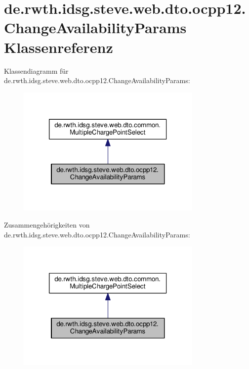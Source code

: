 \hypertarget{classde_1_1rwth_1_1idsg_1_1steve_1_1web_1_1dto_1_1ocpp12_1_1_change_availability_params}{\section{de.\-rwth.\-idsg.\-steve.\-web.\-dto.\-ocpp12.\-Change\-Availability\-Params Klassenreferenz}
\label{classde_1_1rwth_1_1idsg_1_1steve_1_1web_1_1dto_1_1ocpp12_1_1_change_availability_params}
}


Klassendiagramm für de.\-rwth.\-idsg.\-steve.\-web.\-dto.\-ocpp12.\-Change\-Availability\-Params\-:
\nopagebreak
\begin{figure}[H]
\begin{center}
\leavevmode
\includegraphics[width=256pt]{classde_1_1rwth_1_1idsg_1_1steve_1_1web_1_1dto_1_1ocpp12_1_1_change_availability_params__inherit__graph}
\end{center}
\end{figure}


Zusammengehörigkeiten von de.\-rwth.\-idsg.\-steve.\-web.\-dto.\-ocpp12.\-Change\-Availability\-Params\-:
\nopagebreak
\begin{figure}[H]
\begin{center}
\leavevmode
\includegraphics[width=256pt]{classde_1_1rwth_1_1idsg_1_1steve_1_1web_1_1dto_1_1ocpp12_1_1_change_availability_params__coll__graph}
\end{center}
\end{figure}
